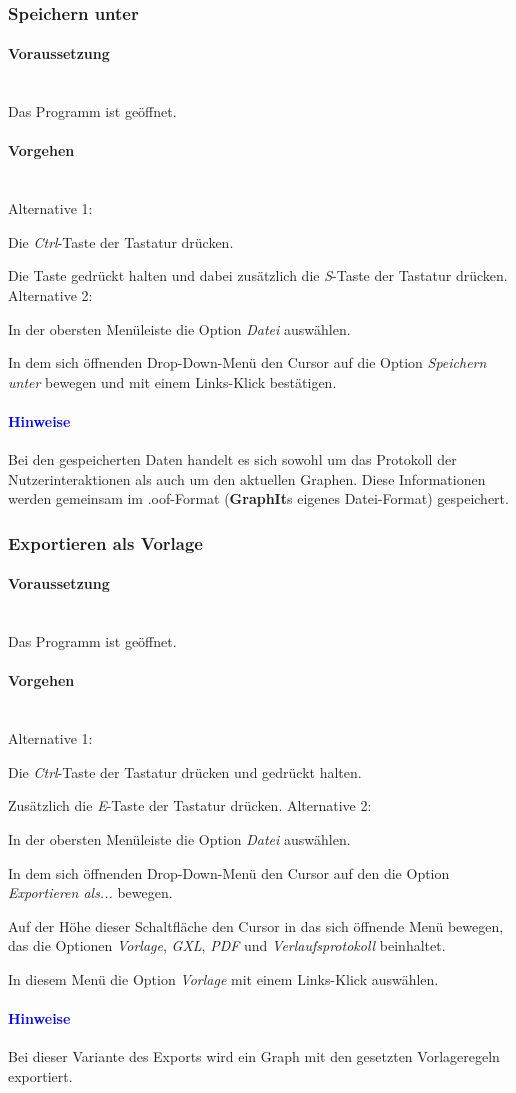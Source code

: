 \documentclass[enabledeprecatedfontcommands,fontsize=11pt,paper=a4,twoside]{scrartcl}
\newcounter{one}
\newcounter{two}[one]
\newcommand*{\hint}{\paragraph{\textcolor{blue}{Hinweise}}}
\newcommand*{\condition}{\paragraph{Voraussetzung}$\;$ \vspace{0.2cm}\\}
\newcommand*{\actions}{\paragraph{Vorgehen} $\;$\vspace{0.2cm}\\}
\newcommand*{\aOne}{\textcolor{bbe}{Alternative 1:}}
\newcommand*{\aTwo}{\textcolor{bbe}{Alternative 2:}}
\let\tempone\itemize
\let\temptwo\enditemize
\renewenvironment{itemize}{\tempone\addtolength{\itemsep}{-10.0pt}}{\temptwo}
\let\origenumerate\enumerate
\let\origendenumerate\endenumerate
\renewenvironment{enumerate}{\origenumerate \addtolength{\itemsep}{-10.0pt}}{\origendenumerate}
\begin{document}
\subsubsection{Speichern unter}
		\condition 	
		Das Programm ist geöffnet.
		\actions
		\aOne
		\begin{enumerate}
				\item Die \textit{Ctrl}-Taste der Tastatur drücken.
				\item Die Taste gedrückt halten und dabei zusätzlich die \textit{S}-Taste der Tastatur drücken.
		\end{enumerate}				
		\aTwo
		\begin{enumerate}
				\item In der obersten Menüleiste die Option \textit{Datei} auswählen. 
				\item In dem sich öffnenden Drop-Down-Menü den Cursor auf die Option \textit{Speichern unter} bewegen und mit einem Links-Klick bestätigen.
		\end{enumerate}		
		\hint
		\begin{itemize}
				\item Bei den gespeicherten Daten handelt es sich sowohl um das Protokoll der Nutzerinteraktionen als auch um den aktuellen Graphen. Diese Informationen werden gemeinsam im .oof-Format (\textbf{GraphIt}s eigenes Datei-Format) gespeichert.\\
		\end{itemize}
		
		\subsubsection{Exportieren als Vorlage}
		\condition 	
		Das Programm ist geöffnet.
		\actions
		\aOne
		\begin{enumerate}
				\item Die \textit{Ctrl}-Taste der Tastatur drücken und gedrückt halten.
				\item Zusätzlich die \textit{E}-Taste der Tastatur drücken.
		\end{enumerate}				
		\aTwo
		\begin{enumerate}
				\item In der obersten Menüleiste die Option \textit{Datei} auswählen. 
				\item In dem sich öffnenden Drop-Down-Menü den Cursor auf den die Option \textit{Exportieren als...} bewegen.
				\item Auf der Höhe dieser Schaltfläche den Cursor in das sich öffnende Menü bewegen, das die Optionen \textit{Vorlage}, \textit{GXL}, \textit{PDF} und \textit{Verlaufsprotokoll} beinhaltet.
				\item In diesem Menü die Option \textit{Vorlage} mit einem Links-Klick auswählen.
		\end{enumerate}		
		\hint
		\begin{itemize}
				\item Bei dieser Variante des Exports wird ein Graph mit den gesetzten Vorlageregeln exportiert. \\
		\end{itemize}
		
\end{document}
